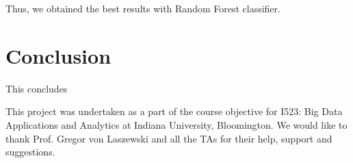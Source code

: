 \documentclass[sigconf]{acmart}
\begin{document}
Thus, we obtained the best results with Random Forest classifier.

\section{Conclusion}
This concludes

\begin{acks}
This project was undertaken as a part of the course objective for I523: Big Data Applications and Analytics at Indiana
University, Bloomington. We would like to thank Prof. Gregor
von Laszewski and all the TAs for their help, support and suggestions. 

\end{acks}


 
\end{document}
